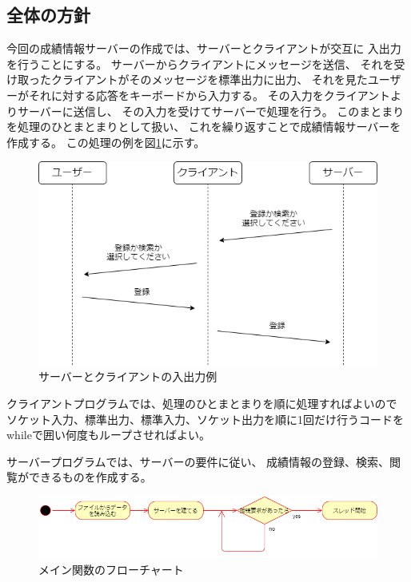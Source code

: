\documentclass[dvipdfmx]{jsarticle}
\begin{document}
\subsection{全体の方針}
今回の成績情報サーバーの作成では、サーバーとクライアントが交互に
入出力を行うことにする。
サーバーからクライアントにメッセージを送信、
それを受け取ったクライアントがそのメッセージを標準出力に出力、
それを見たユーザーがそれに対する応答をキーボードから入力する。
その入力をクライアントよりサーバーに送信し、
その入力を受けてサーバーで処理を行う。
このまとまりを処理のひとまとまりとして扱い、
これを繰り返すことで成績情報サーバーを作成する。
この処理の例を図\ref{example1}に示す。
\begin{figure}[H]
  \centering
  \includegraphics[width=0.7\hsize]{../pic/1.png}
  \caption{サーバーとクライアントの入出力例}
  \label{example1}
\end{figure}

クライアントプログラムでは、処理のひとまとまりを順に処理すればよいので
ソケット入力、標準出力、標準入力、ソケット出力を順に1回だけ行うコードを
whileで囲い何度もループさせればよい。

サーバープログラムでは、サーバーの要件に従い、
成績情報の登録、検索、閲覧ができるものを作成する。

\begin{figure}[H]
  \centering
  \includegraphics[width=0.9\hsize]{../pic/flowchart1.png}
  \caption{メイン関数のフローチャート}
  \label{fc1}
\end{figure}
\end{document}
